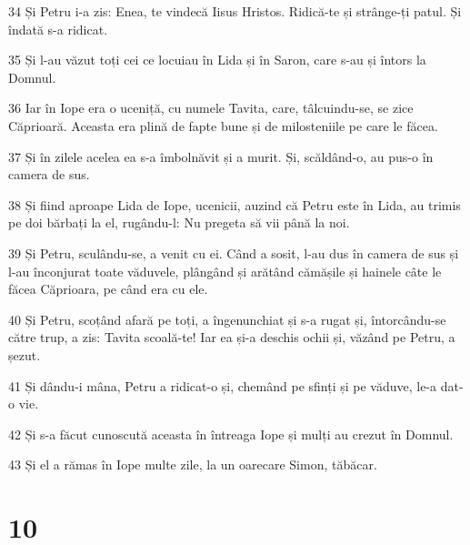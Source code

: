 \par 34 Și Petru i-a zis: Enea, te vindecă Iisus Hristos. Ridică-te și strânge-ți patul. Și îndată s-a ridicat.
\par 35 Și l-au văzut toți cei ce locuiau în Lida și în Saron, care s-au și întors la Domnul.
\par 36 Iar în Iope era o uceniță, cu numele Tavita, care, tâlcuindu-se, se zice Căprioară. Aceasta era plină de fapte bune și de milosteniile pe care le făcea.
\par 37 Și în zilele acelea ea s-a îmbolnăvit și a murit. Și, scăldând-o, au pus-o în camera de sus.
\par 38 Și fiind aproape Lida de Iope, ucenicii, auzind că Petru este în Lida, au trimis pe doi bărbați la el, rugându-l: Nu pregeta să vii până la noi.
\par 39 Și Petru, sculându-se, a venit cu ei. Când a sosit, l-au dus în camera de sus și l-au înconjurat toate văduvele, plângând și arătând cămășile și hainele câte le făcea Căprioara, pe când era cu ele.
\par 40 Și Petru, scoțând afară pe toți, a îngenunchiat și s-a rugat și, întorcându-se către trup, a zis: Tavita scoală-te! Iar ea și-a deschis ochii și, văzând pe Petru, a șezut.
\par 41 Și dându-i mâna, Petru a ridicat-o și, chemând pe sfinți și pe văduve, le-a dat-o vie.
\par 42 Și s-a făcut cunoscută aceasta în întreaga Iope și mulți au crezut în Domnul.
\par 43 Și el a rămas în Iope multe zile, la un oarecare Simon, tăbăcar.

\chapter{10}

